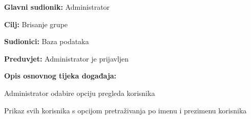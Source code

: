 \documentclass[times, utf8, zavrsni]{fer}
\newenvironment{packed_enum}{
	\begin{enumerate}
		\setlength{\itemsep}{0pt}
		\setlength{\parskip}{0pt}
		\setlength{\parsep}{0pt}
	}{\end{enumerate}}
\newenvironment{packed_item}{
	\begin{itemize}
		\setlength{\itemsep}{0pt}
		\setlength{\parskip}{0pt}
		\setlength{\parsep}{0pt}
	}{\end{itemize}}
\begin{document}
			\noindent {}
					\begin{packed_item}
						
						\item \textbf{Glavni sudionik: } Administrator
						\item  \textbf{Cilj:} Brisanje grupe
						\item  \textbf{Sudionici:} Baza podataka
						\item  \textbf{Preduvjet:} Administrator je prijavljen
						
						\item  \textbf{Opis osnovnog tijeka događaja:}
						
						\item[] \begin{packed_enum}
							
							\item Administrator odabire opciju pregleda korisnika
							\item Prikaz svih korisnika s opcijom pretraživanja po imenu i prezimenu korisnika
							
						\end{packed_enum}
						
					\end{packed_item}
					
\end{document}
